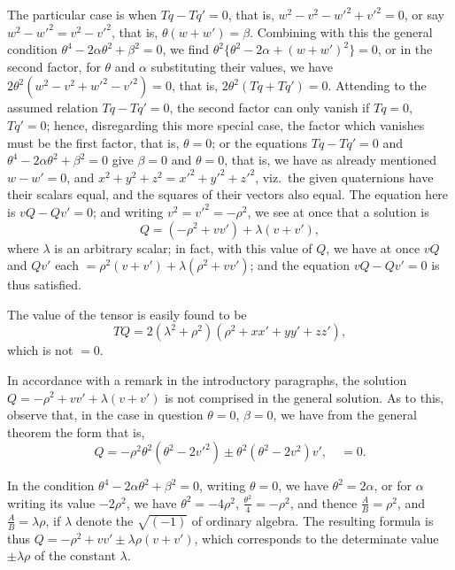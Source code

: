 \documentclass[12pt,a4paper]{article}
\theoremstyle{definition}
\begin{document}
The particular case is when $Tq - Tq' = 0$, that is, $w^2 - v^2 - w'^2 + v'^2 = 0$, or say $w^2 - w'^2 = v^2 - v'^2$, that is, $\theta(w + w') = \beta$. Combining with this the general condition $\theta^4 - 2\alpha\theta^2 + \beta^2 = 0$, we find $\theta^2\{\theta^2 - 2\alpha + (w + w')^2\} = 0$, or in the second factor, for $\theta$ and $\alpha$ substituting their values, we have $2\theta^2(w^2 - v^2 + w'^2 - v'^2) = 0$, that is, $2\theta^2(Tq + Tq') = 0$. Attending to the assumed relation $Tq - Tq' = 0$, the second factor can only vanish if $Tq = 0$, $Tq' = 0$; hence, disregarding this more special case, the factor which vanishes must be the first factor, that is, $\theta = 0$; or the equations $Tq - Tq' = 0$ and $\theta^4 - 2\alpha\theta^2 + \beta^2 = 0$ give $\beta = 0$ and $\theta = 0$, that is, we have as already mentioned $w - w' = 0$, and $x^2 + y^2 + z^2 = x'^2 + y'^2 + z'^2$, viz.\ the given quaternions have their scalars equal, and the squares of their vectors also equal. The equation here is $vQ - Qv' = 0$; and writing $v^2 = v'^2 = -\rho^2$, we see at once that a solution is
\[
Q = (-\rho^2 + vv') + \lambda(v + v'),
\]
where $\lambda$ is an arbitrary scalar; in fact, with this value of $Q$, we have at once $vQ$ and $Qv'$ each $= \rho^2(v + v') + \lambda(\rho^2 + vv')$; and the equation $vQ - Qv' = 0$ is thus satisfied.

The value of the tensor is easily found to be
\[
TQ = 2(\lambda^2 + \rho^2)(\rho^2 + xx' + yy' + zz'),
\]
which is not $= 0$.

In accordance with a remark in the introductory paragraphs, the solution $Q = -\rho^2 + vv' + \lambda(v + v')$ is not comprised in the general solution. As to this, observe that, in the case in question $\theta = 0$, $\beta = 0$, we have from the general theorem the form that is,
\[
Q = -\rho^2 \theta^2 (\theta^2 - 2v'^2) \pm \theta^2 (\theta^2 - 2v^2)v', \quad = 0.
\]

In the condition $\theta^4 - 2\alpha\theta^2 + \beta^2 = 0$, writing $\theta = 0$, we have $\theta^2 = 2\alpha$, or for $\alpha$ writing its value $-2\rho^2$, we have $\theta^2 = -4\rho^2$, $\frac{\theta^2}{4} = -\rho^2$, and thence $\frac{A}{B} = \rho^2$, and $\frac{A}{B} = \lambda\rho$, if $\lambda$ denote the $\sqrt{(-1)}$ of ordinary algebra. The resulting formula is thus $Q = -\rho^2 + vv' \pm \lambda\rho(v + v')$, which corresponds to the determinate value $\pm\lambda\rho$ of the constant $\lambda$.

\newpage
\setcounter{page}{303}
\end{document}
